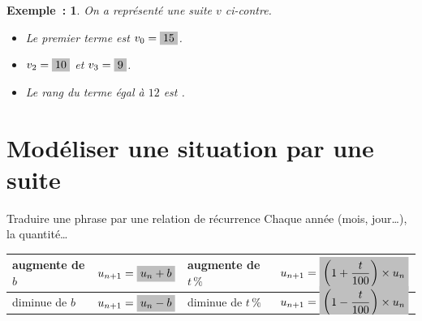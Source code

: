 \documentclass[12pt]{article}
\theoremstyle{break}
\newtheorem*{example}{Exemple~:}
\theoremstyle{inline}
\begin{document}
\vfill
\begin{example}
  \begin{minipage}[t]{0.45\linewidth}
    \vspace{0pt}
    \centering
  \end{minipage}
  \hfill
  \begin{minipage}[t]{0.5\linewidth}
    \vspace{1em}
    On a représenté une suite $v$ ci-contre.
    \begin{itemize}
      \item Le premier terme est $v_0 = \hideM{15}$.
      \item $v_2 = \hideM{10}$ et $v_3 = \hideM{9}$.
      \item Le rang du terme égal à $12$ est .
    \end{itemize}
  \end{minipage}
\end{example}

\vfill
\newpage
\section{Modéliser une situation par une suite}

\begin{method}{Traduire une phrase par une relation de récurrence}{}
  Chaque année (mois, jour\dots), la quantité\dots

  \smallskip
  \begin{tabularx}{\linewidth}{|Y|C{3.3cm}|Y|C{4.6cm}|}
    \hline
    \rule[-1.2em]{0pt}{3.2em}augmente de $b$ & $u_{n+1} = \hideM{u_n + b}$ & augmente de $t\,\%$ & $u_{n+1} = \hideM{\left(1 + \frac{t}{100}\right) \times u_n}$ \\
    \hline
    \rule[-1.2em]{0pt}{3.2em}diminue de $b$ & $u_{n+1} = \hideM{u_n - b}$ & diminue de $t\,\%$ & $u_{n+1} = \hideM{\left(1 - \frac{t}{100}\right) \times u_n}$ \\
    \hline
  \end{tabularx}
\end{method}
\end{document}

